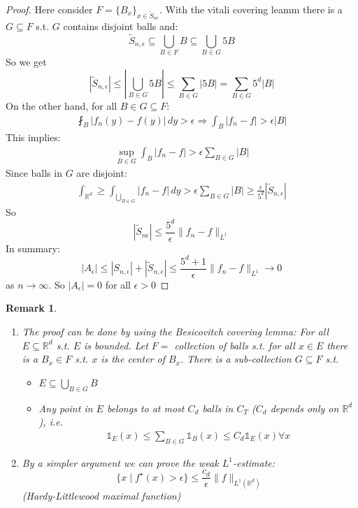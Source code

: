 \documentclass{report}
\theoremstyle{tommy}
\newtheorem{rem}[defn]{Remark}
\begin{document}
\begin{proof}
    Here consider \(F = \{B_x\}_{x \in \tilde S_{n \epsilon}}\). With the vitali covering leamm there is a \(G \subseteq F\) s.t. \(G \) contains disjoint balls and:
    \[\tilde S_{n, \epsilon} \subseteq \bigcup_{B \in F} B \subseteq \bigcup_{B \in G} 5 B\]
    So we get
    \[|\tilde S_{n, \epsilon}| \le |\bigcup_{B \in G} 5B| \le \sum_{B \in G} |5B| = \sum_{B \in G} 5^d|B|\]
    On the other hand, for all \(B \in G \subseteq F\): 
    \begin{align*}
      \fint_B |f_n(y) - f(y)| \, dy > \epsilon \Rightarrow \int_B |f_n - f| > \epsilon|B|
    \end{align*}
    This implies:
    \begin{align*}
      \sup_{B \in G} \int_B |f_n - f| > \epsilon \sum_{B \in G} |B|
    \end{align*}
    Since balls in \(G\) are disjoint:
    \begin{align*}
      \int_{\mathbb{R}^d} \ge \int_{\bigcup_{B \in G}} |f_n - f| \, dy 
      > \epsilon \sum_{B \in G} |B|
      \ge \frac{\epsilon}{5^d} |\tilde S_{n, \epsilon}|
    \end{align*}
    So 
    \[|\tilde S_{n \epsilon}| \le \frac{5^d}{\epsilon} \|f_n - f\|_{L^1}\]
    In summary: 
    \[|A_\epsilon| \le |S_{n, \epsilon}| + |\tilde S_{n, \epsilon}| \le \frac{5^d + 1}{\epsilon} \|f_n - f\|_{L^1} \to 0\]
    as \(n \to \infty\). So \(|A_\epsilon| = 0\) for all \(\epsilon > 0\)
  \end{proof}
  
  \begin{rem}
    \begin{enumerate}
      \item The proof can be done by using the Besicovitch covering lemma: For all \(E \subseteq \mathbb{R}^d\) s.t. \(E\) is bounded. Let \(F = \) collection of balls s.t. for all \(x \in E\) there is a \(B_x \in F\) s.t. \(x\) is the center of \(B_x\). There is a sub-collection \(G \subseteq F\) s.t.
      \begin{itemize}
        \item \(E \subseteq \bigcup_{B \in G} B\)
        \item Any point in \(E\) belongs to at most \(C_d\) balls in \(C_T\) (\(C_d\) depends only on \(\mathbb{R}^d\)), i.e. 
        \begin{align*}
          \mathbb{1}_E(x) \le \sum_{B \in G} \mathbb{1}_B(x) \le C_d \mathbb{1}_E(x) \forall x
        \end{align*}
      \end{itemize}
      \item By a simpler argument we can prove the weak \(L^1\)-estimate:
      \[\{x \mid f^\star(x) > \epsilon\} \le \frac{c_d}{\epsilon} \|f\|_{L^1(\mathbb{R}^d)}\] (Hardy-Littlewood maximal function)
    \end{enumerate}
  \end{rem}
\end{document}
